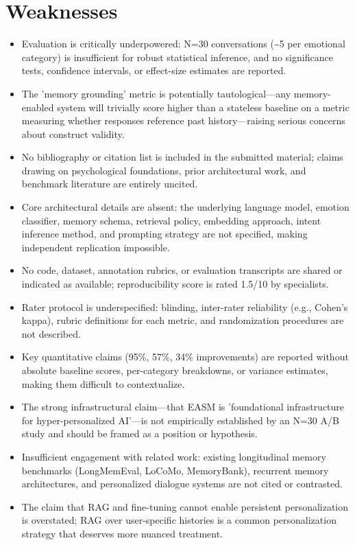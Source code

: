 \documentclass[11pt]{article}
\begin{document}
\section*{Weaknesses}
\begin{itemize}[leftmargin=*]
  \item Evaluation is critically underpowered: N=30 conversations (\~{}5 per emotional category) is insufficient for robust statistical inference, and no significance tests, confidence intervals, or effect-size estimates are reported.
  \item The 'memory grounding' metric is potentially tautological—any memory-enabled system will trivially score higher than a stateless baseline on a metric measuring whether responses reference past history—raising serious concerns about construct validity.
  \item No bibliography or citation list is included in the submitted material; claims drawing on psychological foundations, prior architectural work, and benchmark literature are entirely uncited.
  \item Core architectural details are absent: the underlying language model, emotion classifier, memory schema, retrieval policy, embedding approach, intent inference method, and prompting strategy are not specified, making independent replication impossible.
  \item No code, dataset, annotation rubrics, or evaluation transcripts are shared or indicated as available; reproducibility score is rated 1.5/10 by specialists.
  \item Rater protocol is underspecified: blinding, inter-rater reliability (e.g., Cohen's kappa), rubric definitions for each metric, and randomization procedures are not described.
  \item Key quantitative claims (95\%, 57\%, 34\% improvements) are reported without absolute baseline scores, per-category breakdowns, or variance estimates, making them difficult to contextualize.
  \item The strong infrastructural claim—that EASM is 'foundational infrastructure for hyper-personalized AI'—is not empirically established by an N=30 A/B study and should be framed as a position or hypothesis.
  \item Insufficient engagement with related work: existing longitudinal memory benchmarks (LongMemEval, LoCoMo, MemoryBank), recurrent memory architectures, and personalized dialogue systems are not cited or contrasted.
  \item The claim that RAG and fine-tuning cannot enable persistent personalization is overstated; RAG over user-specific histories is a common personalization strategy that deserves more nuanced treatment.
\end{itemize}
\end{document}

